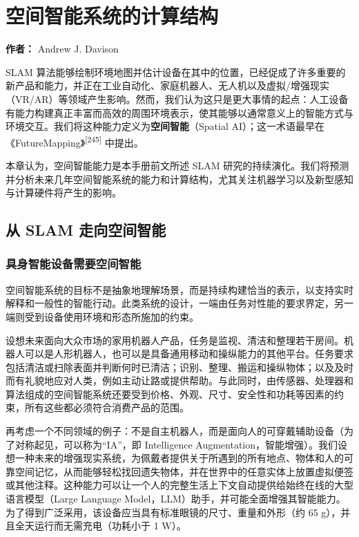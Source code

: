 \chapter{空间智能系统的计算结构}

\textbf{作者：} Andrew J. Davison

SLAM 算法能够绘制环境地图并估计设备在其中的位置，已经促成了许多重要的新产品和能力，并正在工业自动化、家庭机器人、无人机以及虚拟/增强现实（VR/AR）等领域产生影响。然而，我们认为这只是更大事情的起点：人工设备有能力构建真正丰富而高效的周围环境表示，使其能够以通常意义上的智能方式与环境交互。我们将这种能力定义为\textbf{空间智能}（Spatial AI）；这一术语最早在《FutureMapping》\textsuperscript{[245]} 中提出。

本章认为，空间智能能力是本手册前文所述 SLAM 研究的持续演化。我们将预测并分析未来几年空间智能系统的能力和计算结构，尤其关注机器学习以及新型感知与计算硬件将产生的影响。

\section{从 SLAM 走向空间智能}

\subsection{具身智能设备需要空间智能}

空间智能系统的目标不是抽象地理解场景，而是持续构建恰当的表示，以支持实时解释和一般性的智能行动。此类系统的设计，一端由任务对性能的要求界定，另一端则受到设备使用环境和形态所施加的约束。

设想未来面向大众市场的家用机器人产品，任务是监视、清洁和整理若干房间。机器人可以是人形机器人，也可以是具备通用移动和操纵能力的其他平台。任务要求包括清洁或扫除表面并判断何时已清洁；识别、整理、搬运和操纵物体；以及及时而有礼貌地应对人类，例如主动让路或提供帮助。与此同时，由传感器、处理器和算法组成的空间智能系统还要受到价格、外观、尺寸、安全性和功耗等因素的约束，所有这些都必须符合消费产品的范围。

再考虑一个不同领域的例子：不是自主机器人，而是面向人的可穿戴辅助设备（为了对称起见，可以称为“IA”，即 Intelligence Augmentation，智能增强）。我们设想一种未来的增强现实系统，为佩戴者提供关于所遇到的所有地点、物体和人的可靠空间记忆，从而能够轻松找回遗失物体，并在世界中的任意实体上放置虚拟便签或其他注释。这种能力可以让一个人的完整生活上下文自动提供给始终在线的大型语言模型（Large Language Model，LLM）助手，并可能全面增强其智能能力。为了得到广泛采用，该设备应当具有标准眼镜的尺寸、重量和外形（约 65 g），并且全天运行而无需充电（功耗小于 1 W）。

